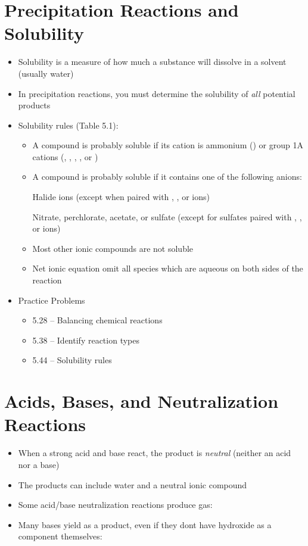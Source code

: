 \documentclass[12pt, openany, letterpaper]{memoir}
\begin{document}
\section{Precipitation Reactions and Solubility}
\begin{itemize}
	\item Solubility is a measure of how much a substance will dissolve in a solvent (usually water)
	\item In precipitation reactions, you must determine the solubility of \emph{all} potential products
	\item Solubility rules (Table 5.1):
	\begin{itemize}
		\item A compound is probably soluble if its cation is ammonium () or group 1A cations (, , , , or )
		\item A compound is probably soluble if it contains one of the following anions:
		
		Halide ions (except when paired with , , or  ions)
		
		Nitrate, perchlorate, acetate, or sulfate (except for sulfates paired with , , or  ions)
		\item Most other ionic compounds are not soluble
		\item Net ionic equation omit all species which are aqueous on both sides of the reaction
	\end{itemize}
	\item Practice Problems
	\begin{itemize}
		\item 5.28 -- Balancing chemical reactions
		\item 5.38 -- Identify reaction types
		\item 5.44 -- Solubility rules
	\end{itemize}
\end{itemize}
\section{Acids, Bases, and Neutralization Reactions}
\begin{itemize}
	\item When a strong acid and base react, the product is \emph{neutral} (neither an acid nor a base)
	\item The products can include water and a neutral ionic compound
	\item Some acid/base neutralization reactions produce gas: 
	\item Many bases yield  as a product, even if they dont have hydroxide as a component themselves: 
\end{itemize}
\end{document}
